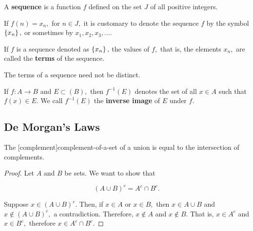 \documentclass{article}
\begin{document}
\begin{definition}[Sequence]
A \textbf{sequence} is a \@{function} $f$ defined on the \@{set} $J$ of all positive \@{integers}.
\end{definition}

\begin{note}\label{sequence-notation}
If $f(n) = x_n,$ for $n \in J,$ it is customary to denote the \@{sequence} $f$ by the symbol $\left\{ x_n \right\},$ or sometimes by $x_1, x_2, x_3, \dots.$
\end{note}

\begin{definition}[Term]
If $f$ is a \@{sequence} denoted as $\left\{ x_n \right\},$ the \@{values} of $f,$ that is, the \@{elements} $x_n,$ are called the \textbf{terms} of the \@{sequence}.
\end{definition}

\begin{note}\label{sequence-terms-not-distinct}
The \@{terms} of a \@{sequence} need not be distinct.
\end{note}

\begin{definition}
If $f: A \to B$ and $E \subset(B),$ then $f^{-1}(E)$ denotes the \@{set} of all $x \in A$ such that $f(x) \in E.$ We call $f^{-1}(E)$ the \textbf{inverse image} of $E$ under $f.$
\end{definition}

\subsection{De Morgan's Laws}

\begin{theorem}\label{complement-of-union-is-intersection-of-complements}
The \@[complement]{complement-of-a-set} of a union is equal to the intersection of complements.
\end{theorem}

\begin{proof}
Let $A$ and $B$ be \@{sets}. We want to show that

\[ (A \cup B)^c = A^c \cap B^c. \]

Suppose $x \in (A \cup B)^c.$ Then, if $x \in A$ or $x \in B,$ then $x \in A \cup B$ and $x \notin (A \cup B)^c,$ a contradiction. Therefore, $x \notin A$ and $x \notin B.$ That is, $x \in A^c$ and $x \in B^c,$ therefore $x \in A^c \cap B^c.$
\end{proof}
\end{document}
